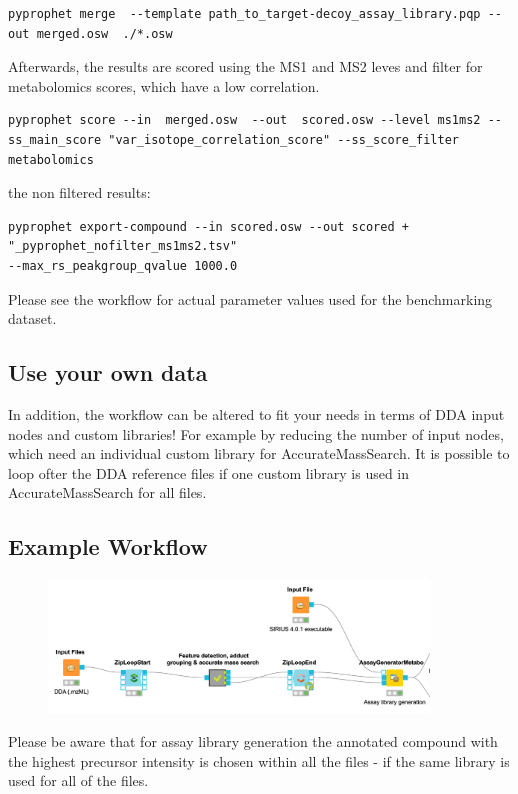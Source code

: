\begin{lstlisting}
pyprophet merge  --template path_to_target-decoy_assay_library.pqp --out merged.osw  ./*.osw
\end{lstlisting}

\noindent Afterwards, the results are scored using the MS1 and MS2 leves and filter for metabolomics scores, which have a low correlation. 

\begin{lstlisting}
pyprophet score --in  merged.osw  --out  scored.osw --level ms1ms2 --ss_main_score "var_isotope_correlation_score" --ss_score_filter metabolomics
\end{lstlisting}
\noindentExport the non filtered results: 

\begin{lstlisting}
pyprophet export-compound --in scored.osw --out scored + "_pyprophet_nofilter_ms1ms2.tsv" 
--max_rs_peakgroup_qvalue 1000.0
\end{lstlisting}
\noindent Please see the workflow for actual parameter values used for the benchmarking dataset. 

\subsection{Use your own data}
In addition, the workflow can be altered to fit your needs in terms of DDA input nodes and custom libraries! For example by reducing the number of input nodes, which need an individual custom library for AccurateMassSearch. It is possible to loop ofter the DDA reference files if one custom library is used in AccurateMassSearch for all files. 

\subsection{Example Workflow}
\begin{figure}[!h]
  \centering
  \includegraphics[width=0.9\textwidth]{graphics/openswathmetabo/loop_feautre.png}
  \caption{}
  \label{fig:pipline_overview}
\end{figure}

Please be aware that for assay library generation the annotated compound with the highest precursor intensity is chosen within all the files - if the same library is used for all of the files.   



